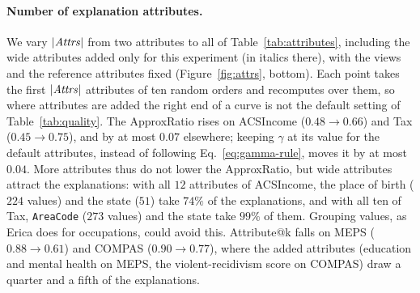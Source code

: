 \paragraph{Number of explanation attributes.}
\label{subsec:attrs}
We vary $|\mathit{Attrs}|$ from two attributes to all of Table~\ref{tab:attributes}, including the wide attributes added only for this experiment (in italics there), with the views and the reference attributes fixed (Figure~\ref{fig:attrs}, bottom).
Each point takes the first $|\mathit{Attrs}|$ attributes of ten random orders and recomputes \BF{} over them, so where attributes are added the right end of a curve is not the default setting of Table~\ref{tab:quality}.
The ApproxRatio rises on ACSIncome ($0.48\rightarrow0.66$) and Tax ($0.45\rightarrow0.75$), and by at most $0.07$ elsewhere; keeping $\gamma$ at its value for the default attributes, instead of following Eq.~\eqref{eq:gamma-rule}, moves it by at most $0.04$.
More attributes thus do not lower the ApproxRatio, but wide attributes attract the explanations: with all $12$ attributes of ACSIncome, the place of birth ($224$ values) and the state ($51$) take $74\%$ of the explanations, and with all ten of Tax, \texttt{AreaCode} ($273$ values) and the state take $99\%$ of them.
Grouping values, as Erica does for occupations, could avoid this.
Attribute@k falls on MEPS ($0.88\rightarrow0.61$) and COMPAS ($0.90\rightarrow0.77$), where the added attributes (education and mental health on MEPS, the violent-recidivism score on COMPAS) draw a quarter and a fifth of the explanations.

